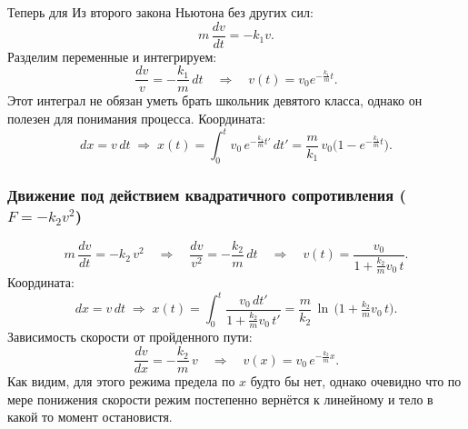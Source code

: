 \documentclass[12pt, a4paper]{article}%
\begin{document}
Теперь для Из второго закона Ньютона без других сил:
\[
m\,\frac{dv}{dt} = -k_1v.
\]
Разделим переменные и интегрируем:
\[
\frac{dv}{v} = -\frac{k_1}{m}\,dt
\quad\Longrightarrow\quad
v(t) = v_0e^{-\tfrac{k_1}{m}t}.
\]
Этот интеграл не обязан уметь брать школьник девятого класса, однако он полезен для понимания процесса.
Координата:
\[
dx = v\,dt
\;\Longrightarrow\;
x(t) = \int_0^t v_0\,e^{-\tfrac{k_1}{m}t'}\,dt'
= \frac{m}{k_1}\,v_0\bigl(1 - e^{-\tfrac{k_1}{m}t}\bigr).
\]




\subsubsection*{Движение под действием квадратичного сопротивления ($F=-k_2v^2$)}
\[
m\,\frac{dv}{dt} = -k_2\,v^2
\quad\Longrightarrow\quad
\frac{dv}{v^2} = -\frac{k_2}{m}\,dt
\quad\Longrightarrow\quad
v(t) = \frac{v_0}{1 + \tfrac{k_2}{m}v_0\,t}.
\]
Координата:
\[
dx = v\,dt
\;\Longrightarrow\;
x(t) = \int_0^t \frac{v_0\,dt'}{1 + \tfrac{k_2}{m}v_0\,t'}
= \frac{m}{k_2}\,\ln\,\!\bigl(1 + \tfrac{k_2}{m}v_0\,t\bigr).
\]
Зависимость скорости от пройденного пути:
\[
\frac{dv}{dx} = -\frac{k_2}{m}\,v
\quad\Longrightarrow\quad
v(x) = v_0\,e^{-\tfrac{k_2}{m}x}.
\]
Как видим, для этого режима предела по $x$ будто бы нет, однако очевидно что по мере понижения скорости режим постепенно вернётся к линейному и тело в какой то момент остановистя.
\end{document}
